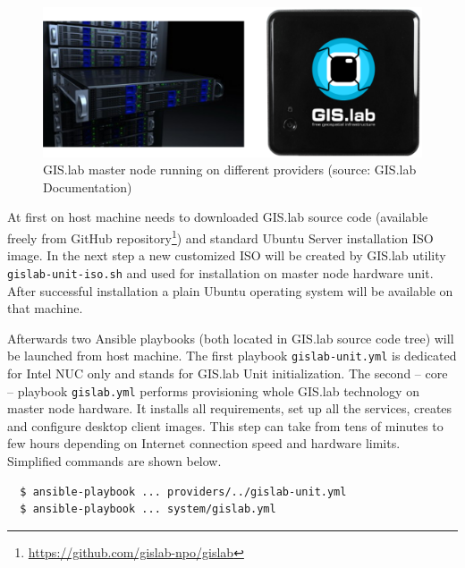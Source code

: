 \documentclass{isprs}
\begin{document}
\begin{figure}[ht!]
\begin{center}
  \includegraphics[width=0.9\columnwidth]{figures/gislab-unit.png}
  \caption{GIS.lab master node running on different providers (source:
    GIS.lab Documentation)}
\label{fig:gislab_infrastructure}
\end{center}
\end{figure}

At first on host machine needs to downloaded GIS.lab source code
(available freely from GitHub
repository\footnote{\url{https://github.com/gislab-npo/gislab}}) and
standard Ubuntu Server installation ISO image. In the next step a new
customized ISO will be created by GIS.lab utility
\texttt{gislab-unit-iso.sh} and used for installation on master node
hardware unit. After successful installation a plain Ubuntu operating
system will be available on that machine.

Afterwards two Ansible playbooks (both located in GIS.lab source code
tree) will be launched from host machine. The first playbook
\texttt{gislab-unit.yml} is dedicated for Intel NUC only and stands
for GIS.lab Unit initialization. The second -- core -- playbook
\texttt{gislab.yml} performs provisioning whole GIS.lab technology on
master node hardware. It installs all requirements, set up all the
services, creates and configure desktop client images. This step can
take from tens of minutes to few hours depending on Internet
connection speed and hardware limits. Simplified commands are shown
below.

\begin{lstlisting}
  $ ansible-playbook ... providers/../gislab-unit.yml
  $ ansible-playbook ... system/gislab.yml
\end{lstlisting}
\end{document}
